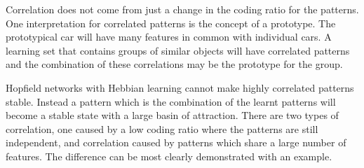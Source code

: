Correlation does not come from just a change in the coding ratio for the patterns.  One interpretation for correlated patterns is the concept of a prototype.  The prototypical car will have many features in common with individual cars.  A learning set that contains groups of similar objects will have correlated patterns and the combination of these correlations may be the prototype for the group.  

Hopfield networks with Hebbian learning cannot make highly correlated patterns stable.  Instead a pattern which is the combination of the learnt patterns will become a stable state with a large basin of attraction.  There are two types of correlation, one caused by a low coding ratio where the patterns are still independent, and correlation caused by patterns which share a large number of features. The difference can be most clearly demonstrated with an example. 

